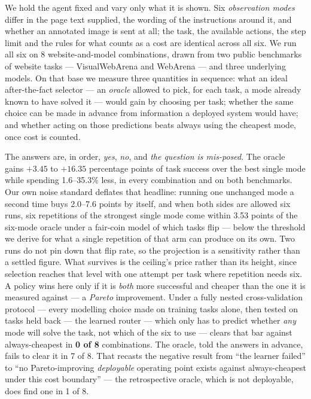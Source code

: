 We hold the agent fixed and vary only what it is shown. Six \emph{observation
modes} differ in the page text supplied, the wording of the instructions around
it, and whether an annotated image is sent at all; the task, the available
actions, the step limit and the rules for what counts as a cost are identical
across all six. We run all six on 8 website-and-model combinations, drawn from
two public benchmarks of website tasks --- VisualWebArena and WebArena --- and
three underlying models. On that base we measure three quantities in sequence:
what an ideal after-the-fact selector --- an \emph{oracle} allowed to pick, for
each task, a mode already known to have solved it --- would gain by choosing per
task; whether the same choice can be made in advance from information a deployed
system would have; and whether acting on those predictions beats always using
the cheapest mode, once cost is counted.

The answers are, in order, \emph{yes}, \emph{no}, and \emph{the question is
mis-posed}. The oracle gains $+3.45$ to $+16.35$ percentage points of task
success over the best single mode while spending 1.6--35.3\% less, in every
combination and on both benchmarks. Our own noise standard deflates that
headline: running one unchanged mode a second time buys 2.0--7.6 points by
itself, and when both sides are allowed six runs, six repetitions of the
strongest single mode come within 3.53 points of the six-mode oracle under a
fair-coin model of which tasks flip --- below the threshold we derive for what a
single repetition of that arm can produce on its own. Two runs do not pin down
that flip rate, so the projection is a sensitivity rather than a settled figure.
What survives is the ceiling's price rather than its height, since selection
reaches that level with one attempt per task where repetition needs six. A
policy wins here only if it is \emph{both} more successful and cheaper than the
one it is measured against --- a \emph{Pareto} improvement. Under a fully nested cross-validation protocol ---
every modelling choice made on training tasks alone, then tested on tasks held
back --- the learned router --- which only has to predict whether \emph{any}
mode will solve the task, not which of the six to use --- clears that bar
against always-cheapest in \textbf{0 of 8} combinations. The oracle, told the answers in
advance, fails to clear it in 7 of 8. That recasts the negative result from
``the learner failed'' to ``no Pareto-improving \emph{deployable} operating
point exists against always-cheapest under this cost boundary'' --- the
retrospective oracle, which is not deployable, does find one in 1 of 8.

